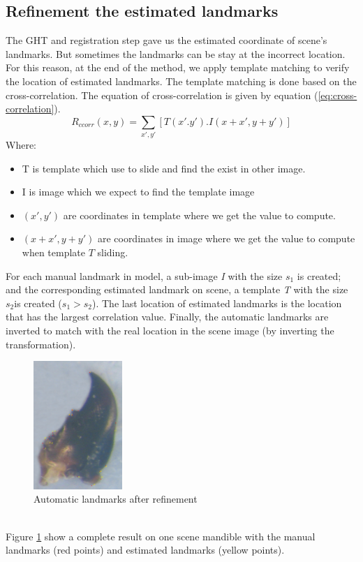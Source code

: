 \documentclass[twoside,twocolumn,10pt]{article}
\begin{document}
\subsection{Refinement the estimated landmarks}
The GHT and registration step gave us the estimated coordinate of scene's landmarks. But sometimes the landmarks can be stay at the incorrect location. For this reason, at the end of the method, we apply template matching to verify the location of estimated landmarks. The template matching is done based on the cross-correlation. The equation of cross-correlation is given by equation (\ref{eq:cross-correlation}).
\begin{equation}
\label{eq:cross-correlation}
	R_{ccorr}(x,y) = \sum\limits_{x',y'}[T(x'.y').I(x + x', y + y')]
\end{equation}
Where:
\begin{itemize}
\item T is template which use to slide and find the exist in other image.
\item I is image which we expect to find the template image
\item $(x', y')$ are coordinates in template where we get the value to compute.
\item $(x + x', y + y')$ are coordinates in image where we get the value to compute when template $T$ sliding.
\end{itemize}
For each manual landmark in model, a sub-image \textit{I} with the size \textit{$s_1$} is created; and the corresponding estimated landmark on scene, a template \textit{T} with the size \textit{$s_2$}is created (\textit{$s_1 > s_2$}). The last location of estimated landmarks is the location that has the largest correlation value. Finally, the automatic landmarks are inverted to match with the real location in the scene image (by inverting the transformation).
\begin{figure}[htb]
    \centering
    \includegraphics[width=0.3\textwidth]{./images/result}
    \caption{Automatic landmarks after refinement}
    \label{figresult}
\end{figure}~\\
Figure \ref{figresult} show a complete result on one scene mandible with the manual landmarks (red points) and estimated landmarks (yellow points).
\end{document}
